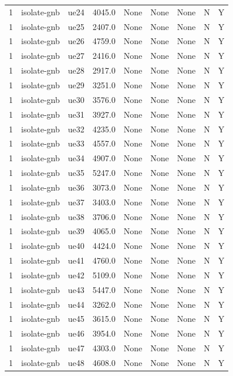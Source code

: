 \begin{table}[ht]
\begin{tabular}{|c|c|c|c|c|c|c|c|c|}
1 & isolate-gnb & ue24 & 4045.0 & None & None & None & N & Y \\
1 & isolate-gnb & ue25 & 2407.0 & None & None & None & N & Y \\
1 & isolate-gnb & ue26 & 4759.0 & None & None & None & N & Y \\
1 & isolate-gnb & ue27 & 2416.0 & None & None & None & N & Y \\
1 & isolate-gnb & ue28 & 2917.0 & None & None & None & N & Y \\
1 & isolate-gnb & ue29 & 3251.0 & None & None & None & N & Y \\
1 & isolate-gnb & ue30 & 3576.0 & None & None & None & N & Y \\
1 & isolate-gnb & ue31 & 3927.0 & None & None & None & N & Y \\
1 & isolate-gnb & ue32 & 4235.0 & None & None & None & N & Y \\
1 & isolate-gnb & ue33 & 4557.0 & None & None & None & N & Y \\
1 & isolate-gnb & ue34 & 4907.0 & None & None & None & N & Y \\
1 & isolate-gnb & ue35 & 5247.0 & None & None & None & N & Y \\
1 & isolate-gnb & ue36 & 3073.0 & None & None & None & N & Y \\
1 & isolate-gnb & ue37 & 3403.0 & None & None & None & N & Y \\
1 & isolate-gnb & ue38 & 3706.0 & None & None & None & N & Y \\
1 & isolate-gnb & ue39 & 4065.0 & None & None & None & N & Y \\
1 & isolate-gnb & ue40 & 4424.0 & None & None & None & N & Y \\
1 & isolate-gnb & ue41 & 4760.0 & None & None & None & N & Y \\
1 & isolate-gnb & ue42 & 5109.0 & None & None & None & N & Y \\
1 & isolate-gnb & ue43 & 5447.0 & None & None & None & N & Y \\
1 & isolate-gnb & ue44 & 3262.0 & None & None & None & N & Y \\
1 & isolate-gnb & ue45 & 3615.0 & None & None & None & N & Y \\
1 & isolate-gnb & ue46 & 3954.0 & None & None & None & N & Y \\
1 & isolate-gnb & ue47 & 4303.0 & None & None & None & N & Y \\
1 & isolate-gnb & ue48 & 4608.0 & None & None & None & N & Y \\

\end{tabular}
\end{table}
